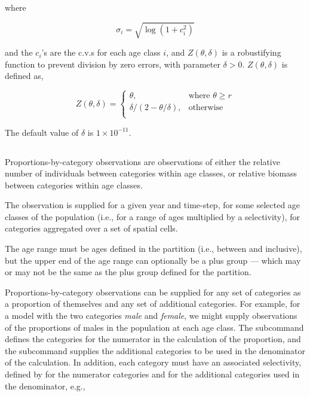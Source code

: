 {{where 

\begin{equation}
  \sigma_i  = \sqrt{\log \left(1+c_i^2 \right)}
\end{equation}

and the $c_i$'s are the c.v.s for each age class $i$, and $Z \left(\theta,\delta \right)$ is a robustifying function to prevent division by zero errors, with parameter $\delta>0$. $Z \left(\theta,\delta \right)$ is defined as,

\begin{equation}
   Z \left(\theta,\delta \right) = \begin{cases}
	  \theta, & \text{where $\theta \ge r$} \\
	  \delta/\left( 2-\theta/\delta \right), & \text{otherwise} \\  
  \end{cases}
\end{equation}

The default value of $\delta$ is $1 \times 10^{-11}$.

\subsection{\label{sec:proportions-by-category}}
Proportions-by-category observations are observations of either the relative number of individuals between categories within age classes, or relative biomass between categories within age classes. 

The observation is supplied for a given year and time-step, for some selected age classes of the population (i.e., for a range of ages multiplied by a selectivity), for categories aggregated over a set of spatial cells. 

The age range must be ages defined in the partition (i.e., between  and  inclusive), but the upper end of the age range can optionally be a plus group --- which may or may not be the same as the plus group defined for the partition. 

Proportions-by-category observations can be supplied for any set of categories as a proportion of themselves and any set of additional categories. For example, for a model with the two categories \emph{male} and \emph{female}, we might supply observations of the proportions of males in the population at each age class. The subcommand  defines the categories for the numerator in the calculation of the proportion, and the subcommand  supplies the additional categories to be used in the denominator of the calculation. In addition, each category must have an associated selectivity, defined by  for the numerator categories and  for the additional categories used in the denominator, e.g., 

}}
